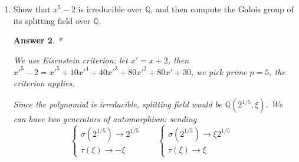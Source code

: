 \documentclass[11pt,leqno]{article}
\newcommand{\Q}{{\mathbb Q}}
\newcommand{\qua}{{\mathbb H}}
\newcommand{\<}[1]{{\langle}#1 {\rangle}}
\theoremstyle{plain}
\newtheorem*{answer*}{Answer}
\theoremstyle{definition}
\theoremstyle{remark}
\numberwithin{equation}{section}
\begin{document}
\begin{enumerate}
\begin{answer*}
\par
Now $Gal(K/\Q)$ needs to be determined as the relation of permutations of roots: consider $\sigma \in Gal(K/\Q)$, which is 
\begin{equation*}
    \begin{cases}
    \sigma(\sqrt{2})\rightarrow -\sqrt{2} &\\
    \sigma(\sqrt{3})\rightarrow \sqrt{3} &
    \end{cases}
\end{equation*}
Then computation shows: 
$$\frac{\sqrt{(-\sqrt{2}+2)(\sqrt{3+3})}}{\sqrt{(\sqrt{2}+2)(\sqrt{3+3})}}
=\frac{\sqrt{\frac{-\sqrt{2}+2}{\sqrt{2}+2}}}{\sqrt{\frac{(-\sqrt{2}+2)^2}{(-\sqrt{2}+2)(\sqrt{2}+2)}}}
=\pm \frac{-\sqrt{2}+2}{\sqrt{2}}$$
But $$(\pm \frac{-\sqrt{2}+2}{\sqrt{2}})^4=1$$
Therefore we know that $\sigma$ is an element of order $4$ in the group of order $8$, similarly we can conclude that $\tau \in Gal(K/\Q)$,
\begin{equation*}
    \begin{cases}
    \tau(\sqrt{2})\rightarrow \sqrt{2} &\\
    \tau(\sqrt{3})\rightarrow -\sqrt{3} &
    \end{cases}
\end{equation*}
is also an element of order $4$. Then the last calculation reveals their product $\sigma\tau$ is still order $4$. Also we have $$\sigma\tau\rho=-(-\sqrt{3}+3)(\sqrt{2}-1)/(\sqrt{6})\rho; \tau\sigma\rho=(-\sqrt{3}+3)(\sqrt{2}-1)/(\sqrt{6})\rho$$ Among non-abelian ordr $8$ groups, we can obtain In $D_8$, the only two order $4$ elements commute since they are rotations. Therefore we conclude the $Gal(K/\Q)$ we have can only be $\qua$.

\end{answer*}


\item Show that $x^5 - 2$ is irreducible over $\Q$, and then compute the Galois group of its splitting field over $\Q$.
  
\begin{answer*}*

We use Eisenstein criterion: let $x'=x+2$, then $x'^5-2=x'^5+10x'^4+40x'^3+80x'^2+80x'+30$, we pick prime $p=5$, the criterion applies.

Since the polynomial is irreducible, splitting field would be $\Q(2^{1/5},\xi)$. We can have two generators of automorphism:  sending 
\begin{equation*}
 \begin{cases}
    \sigma(2^{1/5})\rightarrow2^{1/5}&\\
    \tau(\xi)\rightarrow -\xi &
\end{cases} \quad
 \begin{cases}
    \sigma(2^{1/5})\rightarrow \xi2^{1/5}&\\
    \tau(\xi)\rightarrow \xi &
\end{cases}     
\end{equation*}



\end{answer*}
\end{enumerate}
\end{document}
